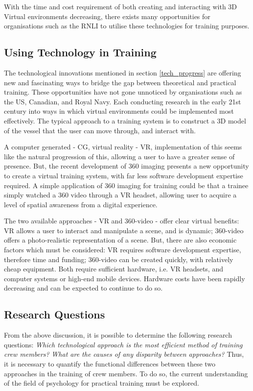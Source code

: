 \documentclass[a4paper, openright, twoside]{book}
\begin{document}
With the time and cost requirement of both creating and interacting with 3D Virtual environments decreasing, there exists many opportunities for organisations such as the RNLI to utilise these technologies for training purposes. 

\subsection{Using Technology in Training }
The technological innovations mentioned in section \ref{tech_progress} are offering new and fascinating ways to bridge the gap between theoretical and practical training.  These opportunities have not gone unnoticed by organisations such as the US, Canadian, and Royal Navy. Each conducting research in the early 21st century into ways in which virtual environments could be implemented most effectively. The typical approach to a training system is to construct a 3D model of the vessel that the user can move through, and interact with. 

A computer generated - CG, virtual reality - VR, implementation of this seems like the natural progression of this, allowing a user to have a greater sense of presence. But, the recent development of 360 imaging presents a new opportunity to create a virtual training system, with far less software development expertise required. A simple application of 360 imaging for training could be that a trainee simply watched a 360 video through a VR headset, allowing user to acquire a level of spatial awareness from a digital experience.

The two available approaches - VR and 360-video - offer clear virtual benefits: VR allows a user to interact and manipulate a scene, and is dynamic; 360-video offers a photo-realistic representation of a scene. But, there are also economic factors which must be considered: VR requires software development expertise, therefore time and funding; 360-video can be created quickly, with relatively cheap equipment. Both require sufficient hardware, i.e. VR headsets, and computer systems or high-end mobile devices.  Hardware costs have been rapidly decreasing and can be expected to continue to do so. 

\subsection{Research Questions}\label{research} 
From the above discussion, it is possible to determine the following research questions:
\hfill \break
\textit{Which technological approach is the most efficient method of training crew members?}
\hfill \break
\textit{What are the causes of any disparity between approaches?}
\hfill \break
Thus, it is necessary to quantify the functional differences between these two approaches in the training of crew members. To do so, the current understanding of the field of psychology for practical training must be explored.
\end{document}
